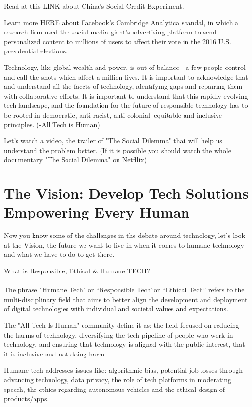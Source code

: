\documentclass[11pt]{book} %
\begin{document}
		Read at this LINK about China’s Social Credit Experiment.
		
		Learn more HERE about Facebook’s Cambridge Analytica scandal, in which a research firm used the social media giant’s advertising platform to send personalized content to millions of users to affect their vote in the 2016 U.S. presidential elections.
		
		Technology, like global wealth and power, is out of balance - a few people control and call the shots which affect a million lives. It is important to acknowledge that and understand all the facets of technology, identifying gaps and repairing them with collaborative efforts. It is important to understand that this rapidly evolving tech landscape, and the foundation for the future of responsible technology has to be rooted in democratic, anti-racist, anti-colonial, equitable and inclusive principles. (-All Tech is Human).
		
		Let's watch a video, the trailer of "The Social Dilemma" that will help us understand the problem better. (If it is possible you should watch the whole documentary "The Social Dilemma" on Netfllix)
	\section{The Vision: Develop Tech Solutions Empowering Every Human}
		Now you know some of the challenges in the debate around technology, let's look at the Vision, the future we want to live in when it comes to humane technology and what we have to do to get there.
		 
		What is Responsible, Ethical \& Humane TECH?
		\paragraph{}The phrase "Humane Tech" or “Responsible Tech”or “Ethical Tech” refers to the multi-disciplinary field that aims to better align the development and deployment of digital technologies with individual and societal values and expectations. 
		
		The "All Tech Is Human" community define it as: the field focused on reducing the harms of technology, diversifying the tech pipeline of people who work in technology, and ensuring that technology is aligned with the public interest, that it is inclusive and not doing harm.
		 
		Humane tech addresses issues like: algorithmic bias, potential job losses through advancing technology, data privacy, the role of tech platforms in moderating speech, the ethics regarding autonomous vehicles and the ethical design of products/apps.
		 
\end{document}
